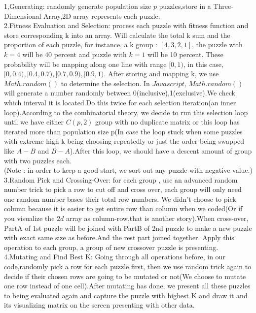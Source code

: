 \documentclass[12pt, letterpaper]{article}
\begin{document}
	1,Generating: randomly generate population size $p$ puzzles,store in a Three-Dimensional Array,2D array represents each puzzle.\\
	
	2.Fitness Evaluation and Selection: process each puzzle with fitness function and store corresponding k into an array. Will calculate the total k sum and the proportion of each puzzle, for instance, a k group : $[4,3,2,1]$, the puzzle with ${k=4}$ will be 40 percent and puzzle with $k=1$ will be 10 percent. These probability will be mapping along one line with range $[0,1)$, in this case,$[0,0.4),[0.4,0.7),[0.7,0.9),[0.9,1)$. After storing and mapping k, we use $Math.random()$ to determine the selection. In $Javascript$, $Math.random()$ will generate a number randomly between 0(inclusive),1(exclusive).We check which interval it is located.Do this twice for each selection iteration(an inner loop).According to the combinatorial theory, we decide to run this selection loop until we have either $C(p,2)$ group with no duplicate matrix or this loop has iterated more than population size p(In case the loop stuck when some puzzles with extreme high k being choosing repeatedly or just the order being swapped like $A-B$ and $B-A$).After this loop, we should have a descent amount of group with two puzzles each.\\
	
	(Note : in order to keep a good start, we sort out any puzzle with negative value.)\\
	
	3.Random Pick and Crossing-Over: for each group , use an advanced random number trick to pick a row to cut off and cross over, each group will only need one random number bases their total row numbers. We didn't choose to pick column because it is easier to get entire row than column when we coded(Or if you visualize the $2d$ array as column-row,that is another story).When cross-over, PartA of 1st puzzle will be joined with PartB of 2nd puzzle to make a new puzzle with exact same size as before.And the rest part joined together. Apply this operation to each group, a group of new crossover puzzle is presenting.\\
	
	4.Mutating and Find Best K: Going through all operations before, in our code,randomly pick a row for each puzzle first, then we use random trick again to decide if their chosen rows are going to be mutated or not(We choose to mutate one row instead of one cell).After mutating has done, we present all these puzzles to being evaluated again and capture the puzzle with highest K and draw it and its visualizing matrix on the screen presenting with other data.\\
	
\end{document}
